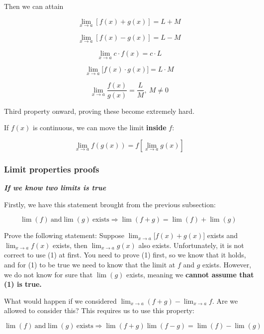 \documentclass[12pt]{article}
\theoremstyle{plain}
\theoremstyle{remark}
\theoremstyle{definition}
\begin{document}
Then we can attain

\[\lim_{x \rightarrow a}{\left\lbrack f(x) + g(x) \right\rbrack = L + M}\]

\[\lim_{x \rightarrow a}{\left\lbrack f(x) - g(x) \right\rbrack = L - M}\]

\[\lim_{x \rightarrow a}{c \cdot f(x) = c \cdot L}\]

\[\lim_{x \rightarrow a}{\lbrack f(x) \cdot g(x)\rbrack = L \cdot M}\]

\[\lim_{x \rightarrow a}{\frac{f(x)}{g(x)} = \frac{L}{M}},\ M \neq 0\]

Third property onward, proving these become extremely hard.

If \(f(x)\) is continuous, we can move the limit \textbf{inside} \(f\):

\[\lim_{x \rightarrow a}{f\left( g(x) \right) = f\left\lbrack \lim_{x \rightarrow a}{g(x)} \right\rbrack}\]


\subsubsection{Limit properties proofs}

\emph{\textbf{If we know two limits is true}}

Firstly, we have this statement brought from the previous subsection:


\begin{equation}
\lim(f)\ \text{and}\lim(g)\ \text{exists} \Rightarrow \lim(f + g) = \lim(f) + \lim(g)\ \tag{1}  \label{eq:1}
\end{equation}


Prove the following statement: Suppose
\(\lim_{x \rightarrow a}{\lbrack f(x) + g(x)\rbrack}\) exists and
\(\lim_{x \rightarrow a}{f(x)}\) exists, then
\(\lim_{x \rightarrow a}{g(x)}\) also exists. Unfortunately, it is not
correct to use (1) at first. You need to prove (1) first, so we know
that it holds, and for (1) to be true we need to know that the limit at
\(f\) and \(g\) exists. However, we do not know for sure that
\(\lim(g)\) exists, meaning we \textbf{cannot assume that (1) is true.}

What would happen if we considered
\(\lim_{x \rightarrow a}{(f + g)} - \lim_{x \rightarrow a}f\). Are we
allowed to consider this? This requires us to use this property:


\begin{equation}
\lim(f)\ \text{and}\lim(g)\ \text{exists} \Rightarrow \lim(f + g)\lim(f - g) = \lim(f) - \lim(g)\ \tag{2}  \label{eq:2}
\end{equation}
\end{document}
